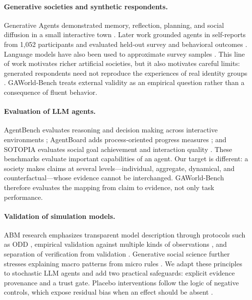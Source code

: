 \documentclass[letterpaper]{article}
\begin{document}
\paragraph{Generative societies and synthetic respondents.}
Generative Agents demonstrated memory, reflection, planning, and social diffusion in a small interactive
town \cite{park2023generative}. Later work grounded agents in self-reports from 1,052 participants and
evaluated held-out survey and behavioral outcomes \cite{park2024grounded}. Language models have also
been used to approximate survey samples \cite{argyle2023outofone}. This line of work motivates richer
artificial societies, but it also motivates careful limits: generated respondents need not reproduce the
experiences of real identity groups \cite{dillion2023replace,wang2025flatten}. GAWorld-Bench treats
external validity as an empirical question rather than a consequence of fluent behavior.

\paragraph{Evaluation of LLM agents.}
AgentBench evaluates reasoning and decision making across interactive environments
\cite{liu2024agentbench}; AgentBoard adds process-oriented progress measures
\cite{ma2024agentboard}; and SOTOPIA evaluates social goal achievement and interaction quality
\cite{zhou2024sotopia}. These benchmarks evaluate important capabilities of an agent. Our target is
different: a society makes claims at several levels---individual, aggregate, dynamical, and
counterfactual---whose evidence cannot be interchanged. GAWorld-Bench therefore evaluates the mapping
from claim to evidence, not only task performance.

\paragraph{Validation of simulation models.}
ABM research emphasizes transparent model description through protocols such as ODD
\cite{grimm2006odd}, empirical validation against multiple kinds of observations
\cite{windrum2007empirical,fagiolo2007critical}, and separation of verification from validation
\cite{sargent2013verification}. Generative social science further stresses explaining macro patterns from
micro rules \cite{epstein2006generative}. We adapt these principles to stochastic LLM agents and add two
practical safeguards: explicit evidence provenance and a trust gate. Placebo interventions follow the
logic of negative controls, which expose residual bias when an effect should be absent
\cite{lipsitch2010negative}.
\end{document}
